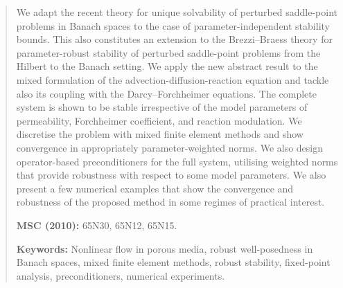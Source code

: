\documentclass[11pt, reqno, a4paper, twoside]{article}
\numberwithin{equation}{section}
\numberwithin{remark}{section}
\numberwithin{figure}{section}
\numberwithin{table}{section}
\begin{document}
\begin{abstract}
\noindent 
We adapt the recent theory for unique solvability of perturbed saddle-point problems in Banach spaces to the case of parameter-independent stability bounds. This also constitutes an extension to the Brezzi--Braess theory for parameter-robust stability of perturbed saddle-point problems from the Hilbert to the Banach setting. We apply the new abstract result to the mixed formulation of the advection-diffusion-reaction equation and tackle also its coupling with the Darcy--Forchheimer equations. The complete system is shown to be stable irrespective of the model parameters of permeability, Forchheimer coefficient,   and reaction modulation. We discretise the problem with mixed finite element methods and show convergence in appropriately parameter-weighted norms. We also design operator-based preconditioners for the full system, utilising weighted norms that provide robustness with respect to {some model parameters}. 
We also present a few numerical examples that show the {convergence and robustness of the proposed method} in some regimes of practical interest.

\medskip
\noindent\textbf{MSC (2010):} 65N30, 65N12, 65N15.

\medskip 
\noindent\textbf{Keywords:} Nonlinear flow in porous media, robust well-posedness in Banach spaces, mixed finite element methods, robust stability, fixed-point analysis, preconditioners, numerical experiments.
\end{abstract}

\end{document}
